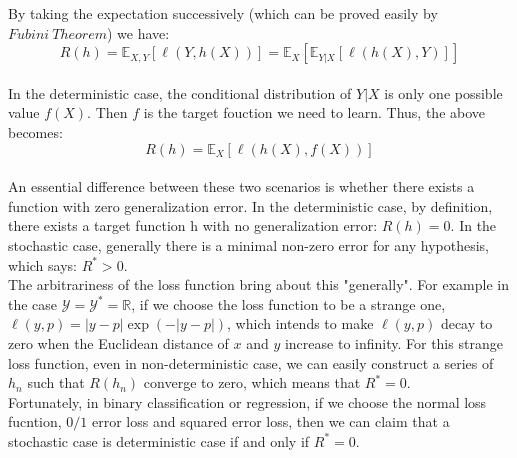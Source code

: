 \noindent By taking the expectation successively (which can be proved easily by $Fubini \ Theorem$) we have:
\begin{equation}
R(h)=\mathbb{E}_{X,Y}[\ell(Y, h(X))]=\mathbb{E}_{X} \left[ \mathbb{E}_{Y|X}[\ell(h(X),Y)] \right] 	
\end{equation}\\
In the deterministic case, the conditional distribution of $Y|X$ is only one possible value $f(X)$. Then $f$ is the target fouction we need to learn. Thus, the above becomes:
\begin{equation}
R(h)=\mathbb{E}_{X}[\ell(h(X),f(X))]
\end{equation}\\
\noindent An essential difference between these two scenarios is whether there exists a function with zero generalization error.
In the deterministic case, by definition, there exists a target function h with no generalization error: $R(h)=0$. In the stochastic case, generally there is a minimal non-zero error for any hypothesis, which says: $R^*>0$.\\
The arbitrariness of the loss function bring about this "generally". For example in the case $\mathcal{Y}=\mathcal{Y}^*=\mathbb{R}$, if we choose the loss function to be a strange one, $\ell(y,p)=|y-p|\exp(-|y-p|)$, which intends to make $\ell(y,p)$ decay to zero when the Euclidean distance of $x$ and $y$ increase to infinity. For this strange loss function, even in non-deterministic case, we can easily construct a series of $h_n$ such that $R(h_n)$ converge to zero, which means that $R^*=0$. \\

Fortunately, in binary classification or regression, if we choose the normal loss fucntion, $0/1$ error loss and squared error loss, then we can claim that a stochastic case is deterministic case if and only if $R^*=0$. \\

